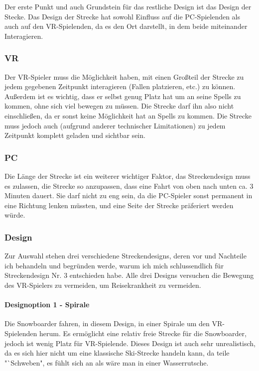 Der erste Punkt und auch Grundstein für das restliche Design ist das Design der Stecke. Das Design der Strecke hat sowohl Einfluss auf die PC-Spielenden als auch auf den VR-Spielenden, da es den Ort darstellt, in dem beide miteinander Interagieren.

\subsubsection{VR}

Der VR-Spieler muss die Möglichkeit haben, mit einen Großteil der Strecke zu jedem gegebenen Zeitpunkt interagieren (Fallen platzieren, etc.) zu können. Außerdem ist es wichtig, dass er selbst genug Platz hat um an seine Spells zu kommen, ohne sich viel bewegen zu müssen. Die Strecke darf ihn also nicht einschließen, da er sonst keine Möglichkeit hat an Spells zu kommen. Die Strecke muss jedoch auch (aufgrund anderer technischer Limitationen) zu jedem Zeitpunkt komplett geladen und sichtbar sein.

\subsubsection{PC}

Die Länge der Strecke ist ein weiterer wichtiger Faktor, das Streckendesign muss es zulassen, die Strecke so anzupassen, dass eine Fahrt von oben nach unten ca. 3 Minuten dauert. Sie darf nicht zu eng sein, da die PC-Spieler sonst permanent in eine Richtung lenken müssten, und eine Seite der Strecke präferiert werden würde.

\subsubsection{Design}

Zur Auswahl stehen drei verschiedene Streckendesigns, deren vor und Nachteile ich behandeln und begründen werde, warum ich mich schlussendlich für Streckendesign Nr. 3 entschieden habe. Alle drei Designs versuchen die Bewegung des VR-Spielers zu vermeiden, um Reisekrankheit zu vermeiden.

\paragraph{Designoption 1 - Spirale}

Die Snowboarder fahren, in diesem Design, in einer Spirale um den VR-Spielenden herum. Es ermöglicht eine relativ freie Strecke für die Snowboarder, jedoch ist wenig Platz für VR-Spielende. Dieses Design ist auch sehr unrealistisch, da es sich hier nicht um eine klassische Ski-Strecke handeln kann, da teile "`Schweben", es fühlt sich an als wäre man in einer Wasserrutsche.

